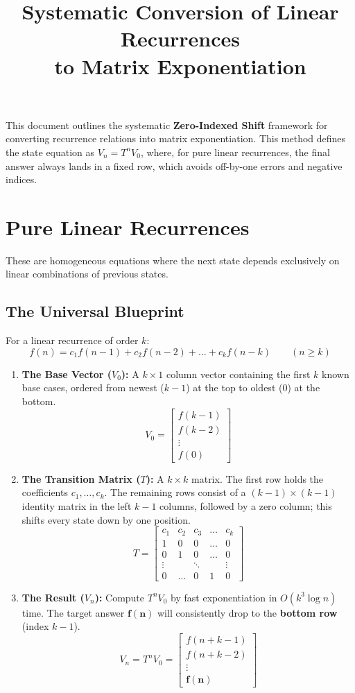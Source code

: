 \documentclass[11pt]{article}
\title{\textbf{Systematic Conversion of Linear Recurrences \\ to Matrix Exponentiation}}
\author{}
\date{}
\begin{document}
\maketitle

This document outlines the systematic \textbf{Zero-Indexed Shift} framework for converting recurrence relations into matrix exponentiation. This method defines the state equation as $V_n = T^n V_0$, where, for pure linear recurrences, the final answer always lands in a fixed row, which avoids off-by-one errors and negative indices.

\section{Pure Linear Recurrences}
These are homogeneous equations where the next state depends exclusively on linear combinations of previous states.

\subsection{The Universal Blueprint}
For a linear recurrence of order $k$:
\[ f(n) = c_1f(n-1) + c_2f(n-2) + \dots + c_kf(n-k) \qquad (n \ge k) \]

\begin{enumerate}
    \item \textbf{The Base Vector ($V_0$):} A $k \times 1$ column vector containing the first $k$ known base cases, ordered from newest ($k-1$) at the top to oldest ($0$) at the bottom.
    \[
    V_0 = \begin{bmatrix} f(k-1) \\ f(k-2) \\ \vdots \\ f(0) \end{bmatrix}
    \]
    
    \item \textbf{The Transition Matrix ($T$):} A $k \times k$ matrix. The first row holds the coefficients $c_1, \dots, c_k$. The remaining rows consist of a $(k-1)\times(k-1)$ identity matrix in the left $k-1$ columns, followed by a zero column; this shifts every state down by one position.
    \[
    T = \begin{bmatrix} 
    c_1 & c_2 & c_3 & \dots & c_k \\ 
    1 & 0 & 0 & \dots & 0 \\ 
    0 & 1 & 0 & \dots & 0 \\ 
    \vdots & & \ddots & & \vdots \\ 
    0 & \dots & 0 & 1 & 0 
    \end{bmatrix}
    \]
    
    \item \textbf{The Result ($V_n$):} Compute $T^n V_0$ by fast exponentiation in $O(k^3 \log n)$ time. The target answer $\mathbf{f(n)}$ will consistently drop to the \textbf{bottom row} (index $k-1$).
    \[
    V_n = T^n V_0 = \begin{bmatrix} f(n+k-1) \\ f(n+k-2) \\ \vdots \\ \mathbf{f(n)} \end{bmatrix}
    \]
\end{enumerate}
\end{document}
